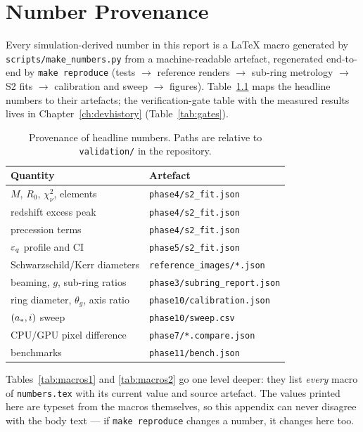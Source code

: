 \chapter{Number Provenance}
\label{app:provenance}

Every simulation-derived number in this report is a \LaTeX{} macro
generated by \texttt{scripts/make\_numbers.py} from a machine-readable
artefact, regenerated end-to-end by \texttt{make reproduce}
(tests $\to$ reference renders $\to$ sub-ring metrology $\to$ S2 fits
$\to$ calibration and sweep $\to$ figures). Table~\ref{tab:prov} maps the
headline numbers to their artefacts; the verification-gate table with the
measured results lives in Chapter~\ref{ch:devhistory}
(Table~\ref{tab:gates}).

\begin{table}[ht]
\centering
\caption{Provenance of headline numbers. Paths are relative to
\texttt{validation/} in the repository.}
\label{tab:prov}
\begin{tabular}{ll}
\toprule
Quantity & Artefact \\
\midrule
$M$, $R_0$, $\chi^2_\nu$, elements & \texttt{phase4/s2\_fit.json} \\
redshift excess peak & \texttt{phase4/s2\_fit.json} \\
precession terms & \texttt{phase4/s2\_fit.json} \\
$\varepsilon_q$ profile and CI & \texttt{phase5/s2\_fit.json} \\
Schwarzschild/Kerr diameters & \texttt{reference\_images/*.json} \\
beaming, $g$, sub-ring ratios & \texttt{phase3/subring\_report.json} \\
ring diameter, $\theta_g$, axis ratio & \texttt{phase10/calibration.json} \\
$(a_*, i)$ sweep & \texttt{phase10/sweep.csv} \\
CPU/GPU pixel difference & \texttt{phase7/*.compare.json} \\
benchmarks & \texttt{phase11/bench.json} \\
\bottomrule
\end{tabular}
\end{table}

Tables~\ref{tab:macros1} and \ref{tab:macros2} go one level deeper:
they list \emph{every} macro of \texttt{numbers.tex} with its current
value and source artefact. The values printed here are typeset from
the macros themselves, so this appendix can never disagree with the
body text — if \texttt{make reproduce} changes a number, it changes
here too.

